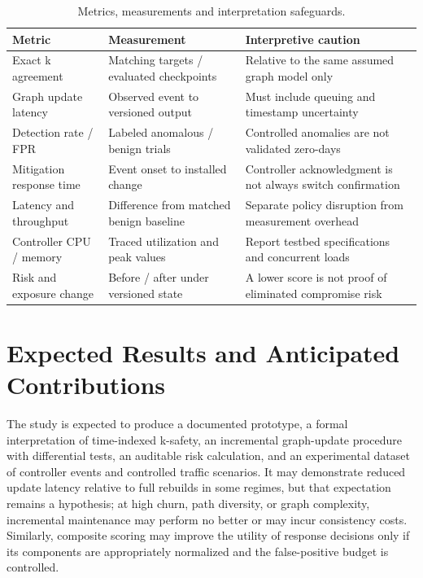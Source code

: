\documentclass[12pt,a4paper,oneside]{article}
\begin{document}
\begin{table}[htbp]
\centering\small
\caption{Metrics, measurements and interpretation safeguards.}\label{tab:evaluation}
\begin{tabularx}{\textwidth}{@{}p{34mm}p{48mm}X@{}}
\toprule
\textbf{Metric} & \textbf{Measurement} & \textbf{Interpretive caution}\\\midrule
Exact k agreement & Matching targets / evaluated checkpoints & Relative to the same assumed graph model only\\
Graph update latency & Observed event to versioned output & Must include queuing and timestamp uncertainty\\
Detection rate / FPR & Labeled anomalous / benign trials & Controlled anomalies are not validated zero-days\\
Mitigation response time & Event onset to installed change & Controller acknowledgment is not always switch confirmation\\
Latency and throughput & Difference from matched benign baseline & Separate policy disruption from measurement overhead\\
Controller CPU / memory & Traced utilization and peak values & Report testbed specifications and concurrent loads\\
Risk and exposure change & Before / after under versioned state & A lower score is not proof of eliminated compromise risk\\
\bottomrule
\end{tabularx}
\end{table}

\section{Expected Results and Anticipated Contributions}\label{sec:contrib}
The study is expected to produce a documented prototype, a formal interpretation of time-indexed k-safety, an incremental graph-update procedure with differential tests, an auditable risk calculation, and an experimental dataset of controller events and controlled traffic scenarios. It may demonstrate reduced update latency relative to full rebuilds in some regimes, but that expectation remains a hypothesis; at high churn, path diversity, or graph complexity, incremental maintenance may perform no better or may incur consistency costs. Similarly, composite scoring may improve the utility of response decisions only if its components are appropriately normalized and the false-positive budget is controlled.
\end{document}
